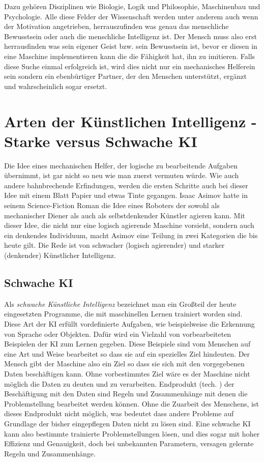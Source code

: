 \documentclass[a4paper,12pt,german,ngerman]{report}
\begin{document}
    Dazu gehören Disziplinen wie Biologie, Logik und Philosophie, Maschinenbau und Psychologie.\cite[56]{buchanan2005very}
    Alle diese Felder der Wissenschaft werden unter anderem auch wenn der Motivation angetrieben, herrauszufinden was genau
    das menschliche Bewusstsein oder auch die menschliche Intelligenz ist. Der Mensch muss also erst herrausfinden was
    sein eigener Geist bzw. sein Bewusstsein ist, bevor er diesen in eine Maschine implementieren kann die die Fähigkeit
    hat, ihn zu imitieren. Falls diese Suche einmal erfolgreich ist, wird dies nicht nur ein mechanisches Helferein
    sein sondern ein ebenbürtiger Partner, der den Menschen unterstützt, ergänzt und wahrscheinlich sogar ersetzt.


    \chapter{Arten der Künstlichen Intelligenz - Starke versus Schwache KI}
    Die Idee eines mechanischen Helfer, der logische zu bearbeitende Aufgaben übernimmt, ist gar nicht so neu wie man
    zuerst vermuten würde. Wie auch andere bahnbrechende Erfindungen, werden die ersten Schritte auch bei dieser Idee
    mit einem Blatt Papier und etwas Tinte gegangen. Isaac Asimov hatte in seinem Science-Fiction Roman 
    die Idee eines Roboters der sowohl als mechanischer Diener als auch als selbstdenkender Künstler agieren kann.\cite{asimov2000der}
    Mit dieser Idee, die nicht nur eine logisch agierende Maschine vorsieht, sondern auch ein denkendes Individuum, macht Asimov
    eine Teilung in zwei Kategorien die bis heute gilt. Die Rede ist von schwacher (logisch agierender) und starker (denkender) Künstlicher Intelligenz.\\

    \section{Schwache KI}
    Als \emph{schwache Künstliche Intelligenz} bezeichnet man ein Großteil der heute eingesetzten Programme, die mit
    maschinellen Lernen trainiert worden sind.\cite{ibm2021whatisAI} Diese Art der KI erfüllt vordefinierte Aufgaben,
    wie beispielweise die Erkennung von Sprache oder Objekten. Dafür wird ein Vielzahl von vorbearbeiteten Beispielen der KI
    zum Lernen gegeben. Diese Beispiele sind vom Menschen auf eine Art und Weise bearbeitet so dass sie auf ein spezielles Ziel hindeuten.
    Der Mensch gibt der Maschine also ein Ziel so dass sie sich mit den vorgegebenen Daten beschäftigen kann.
    Ohne vorbestimmtes Ziel wäre es der Maschine nicht möglich die Daten zu deuten und zu verarbeiten.
    Endprodukt (tech. ) der Beschäftigung mit den Daten sind Regeln und Zusammenhänge
    mit denen die Problemstellung bearbeitet werden können. Ohne die Zuarbeit des Menschens, ist dieses Endprodukt nicht
    möglich, was bedeutet dass andere Probleme auf Grundlage der bisher eingepflegen Daten nicht zu lösen sind.
    Eine schwache KI kann also bestimmte trainierte Problemstellungen lösen, und dies sogar mit hoher Effizienz und Genauigkeit, doch bei
    unbekannten Parametern, versagen gelernte Regeln und Zusammenhänge.\\
\end{document}
